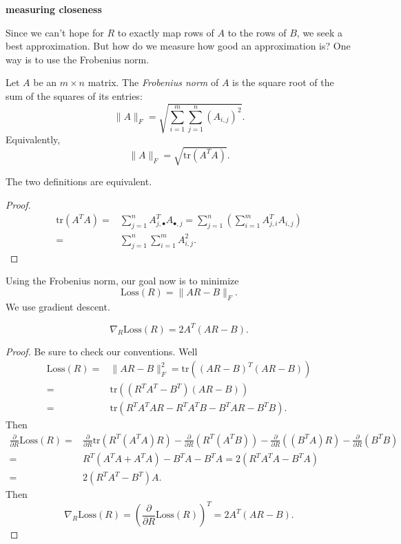 \documentclass[12pt]{article}
\begin{document}
\textbf{measuring closeness}

Since we can't hope for $R$ to exactly map rows of $A$ to the rows of $B$, we seek a best approximation. But how do we measure how good an approximation is? One way is to use the Frobenius norm.

\begin{definition}
	Let $A$ be an $m\times n$ matrix. The \emph{Frobenius norm} of $A$ is the square root of the sum of the squares of its entries: 
	\begin{equation*}
		\|A\|_F = \sqrt{\sum_{i=1}^m \sum_{j=1}^n (A_{i,j})^2}.
	\end{equation*}
	Equivalently,
	\begin{equation*}
		\|A\|_F = \sqrt{\text{tr}(A^TA)}.
	\end{equation*}
\end{definition}

\begin{proposition}
	The two definitions are equivalent.
\end{proposition}
\begin{proof} 
	\begin{align*}
		\text{tr}(A^TA)
		=& \sum_{j=1}^n A^T_{j,\bullet}A_{\bullet, j} = \sum_{j=1}^n \left( \sum_{i=1}^m A^T_{j,i}A_{i,j}\right) \\
		=& \sum_{j=1}^n \sum_{i=1}^m A_{i,j}^2.
	\end{align*}
\end{proof}	

Using the Frobenius norm, our goal now is to minimize 
\begin{equation*}
	\text{Loss}(R) = \|AR-B\|_F.
\end{equation*}
We use gradient descent.

\begin{proposition}
	\begin{equation*}
		\nabla_R\text{Loss}(R) = 2A^T(AR-B).
	\end{equation*}
\end{proposition}
\begin{proof} 
	Be sure to check our conventions. Well 
	\begin{align*}
		\text{Loss}(R) 
		=& \|AR-B\|^2_F = \text{tr}((AR-B)^T(AR-B)) \\
		=& \text{tr}((R^TA^T - B^T)(AR-B)) \\
		=& \text{tr}(R^TA^TAR - R^TA^TB - B^TAR - B^TB).
	\end{align*}
	Then 
	\begin{align*}
		\frac{\partial}{\partial R}\text{Loss}(R) 
		=& \frac{\partial}{\partial R}\text{tr}(R^T(A^TA)R) - \frac{\partial}{\partial R}(R^T(A^TB)) - \frac{\partial}{\partial R}((B^TA)R) - \frac{\partial}{\partial R}(B^TB) \\ 
		=& R^T(A^TA + A^TA) - B^TA - B^TA = 2(R^TA^TA - B^TA) \\
		=& 2(R^TA^T - B^T)A.
	\end{align*}
	Then 
	\begin{equation*}
		\nabla_R\text{Loss}(R) = (\frac{\partial}{\partial R}\text{Loss}(R))^T = 2A^T(AR-B).
	\end{equation*}
\end{proof}	
\end{document}
